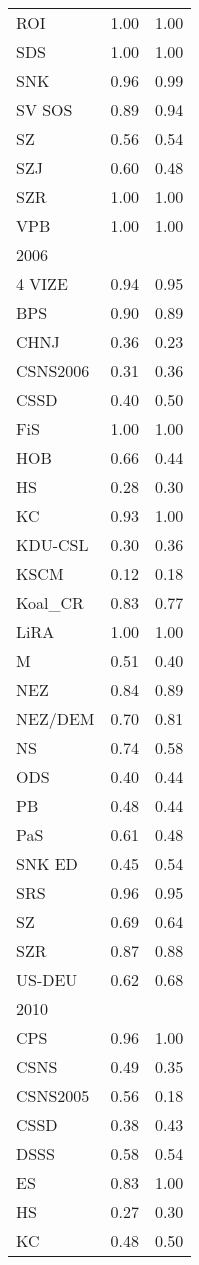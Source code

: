 \begin{tabular}{l|r|r}
ROI & 1.00 & 1.00\\
SDS & 1.00 & 1.00\\
SNK & 0.96 & 0.99\\
SV SOS & 0.89 & 0.94\\
SZ & 0.56 & 0.54\\
SZJ & 0.60 & 0.48\\
SZR & 1.00 & 1.00\\
VPB & 1.00 & 1.00\\
\hline
\multicolumn{3}{l}{2006} \\
4 VIZE & 0.94 & 0.95\\
BPS & 0.90 & 0.89\\
CHNJ & 0.36 & 0.23\\
CSNS2006 & 0.31 & 0.36\\
CSSD & 0.40 & 0.50\\
FiS & 1.00 & 1.00\\
HOB & 0.66 & 0.44\\
HS & 0.28 & 0.30\\
KC & 0.93 & 1.00\\
KDU-CSL & 0.30 & 0.36\\
KSCM & 0.12 & 0.18\\
Koal\_CR & 0.83 & 0.77\\
LiRA & 1.00 & 1.00\\
M & 0.51 & 0.40\\
NEZ & 0.84 & 0.89\\
NEZ/DEM & 0.70 & 0.81\\
NS & 0.74 & 0.58\\
ODS & 0.40 & 0.44\\
PB & 0.48 & 0.44\\
PaS & 0.61 & 0.48\\
SNK ED & 0.45 & 0.54\\
SRS & 0.96 & 0.95\\
SZ & 0.69 & 0.64\\
SZR & 0.87 & 0.88\\
US-DEU & 0.62 & 0.68\\
\hline
\multicolumn{3}{l}{2010} \\
CPS & 0.96 & 1.00\\
CSNS & 0.49 & 0.35\\
CSNS2005 & 0.56 & 0.18\\
CSSD & 0.38 & 0.43\\
DSSS & 0.58 & 0.54\\
ES & 0.83 & 1.00\\
HS & 0.27 & 0.30\\
KC & 0.48 & 0.50\\

\end{tabular}
